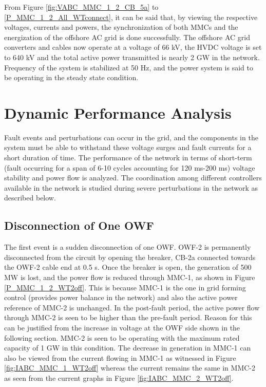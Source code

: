 From Figure \ref{fig:VABC_MMC_1_2_CB_5a} to \ref{P_MMC_1_2_All_WTconnect}, it can be said that, by viewing the respective voltages, currents and powers, the synchronization of both \gls{MMC}s and the energization of the offshore \gls{AC} grid is done successfully. The offshore \gls{AC} grid converters and cables now operate at a voltage of 66 kV, the \gls{HVDC} voltage is set to 640 kV and the total active power transmitted is nearly 2 GW in the network. Frequency of the system is stabilized at 50 Hz, and the power system is said to be operating in the steady state condition.  

\section{Dynamic Performance Analysis}
Fault events and perturbations can occur in the grid, and the components in the system must be able to withstand these voltage surges and fault currents for a short duration of time. The performance of the network in terms of short-term (fault occurring for a span of 6-10 cycles accounting for 120 ms-200 ms) voltage stability and power flow is analyzed. The coordination among different controllers available in the network is studied during severe perturbations in the network as described below.  

\subsection{Disconnection of One OWF}\label{disconnection_one_OWF}
The first event is a sudden disconnection of one \gls{OWF}. \gls{OWF}-2 is permanently disconnected from the circuit by opening the breaker, CB-2a connected towards the \gls{OWF}-2 cable end at 0.5 s. Once the breaker is open, the generation of 500 MW is lost, and the power flow is reduced through \gls{MMC}-1, as shown in Figure \ref{P_MMC_1_2_WT2off}. This is because \gls{MMC}-1 is the one in grid forming control (provides power balance in the network) and also the active power reference of \gls{MMC}-2 is unchanged. In the post-fault period, the active power flow through \gls{MMC}-2 is seen to be higher than the pre-fault period. Reason for this can be justified from the increase in voltage at the \gls{OWF} side shown in the following section. \gls{MMC}-2 is seen to be operating with the maximum rated capacity of 1 GW in this condition. The decrease in generation in \gls{MMC}-1 can also be viewed from the current flowing in \gls{MMC}-1 as witnessed in Figure \ref{fig:IABC_MMC_1_WT2off} whereas the current remains the same in \gls{MMC}-2 as seen from the current graphs in Figure \ref{fig:IABC_MMC_2_WT2off}.  


